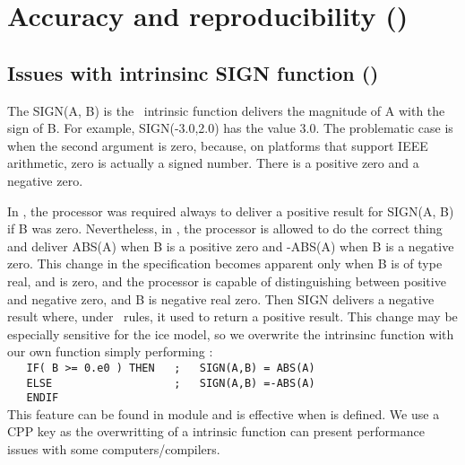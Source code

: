 \documentclass[../main/NEMO_manual]{subfiles}
\begin{document}
\section[Accuracy and reproducibility (\textit{lib\_fortran.F90})]{Accuracy and reproducibility (\protect{})}
\label{sec:MISC_fortran}

\subsection[Issues with intrinsinc SIGN function (\texttt{\textbf{key\_nosignedzero}})]{Issues with intrinsinc SIGN function (\protect{})}
\label{subsec:MISC_sign}

The SIGN(A, B) is the \fortran\ intrinsic function delivers the magnitude of A with the sign of B.
For example, SIGN(-3.0,2.0) has the value 3.0.
The problematic case is when the second argument is zero, because, on platforms that support IEEE arithmetic,
zero is actually a signed number.
There is a positive zero and a negative zero.

In \fninety, the processor was required always to deliver a positive result for SIGN(A, B) if B was zero.
Nevertheless, in \fninety, the processor is allowed to do the correct thing and deliver ABS(A) when
B is a positive zero and -ABS(A) when B is a negative zero.
This change in the specification becomes apparent only when B is of type real, and is zero,
and the processor is capable of distinguishing between positive and negative zero,
and B is negative real zero.
Then SIGN delivers a negative result where, under \fninety\ rules, it used to return a positive result.
This change may be especially sensitive for the ice model,
so we overwrite the intrinsinc function with our own function simply performing :   \\
\verb?   IF( B >= 0.e0 ) THEN   ;   SIGN(A,B) = ABS(A)  ?    \\
\verb?   ELSE                   ;   SIGN(A,B) =-ABS(A)     ?  \\
\verb?   ENDIF    ? \\
This feature can be found in  module and is effective when  is defined.
We use a CPP key as the overwritting of a intrinsic function can present performance issues with
some computers/compilers.
\end{document}
